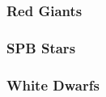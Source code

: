 {\color{red}



\subsubsection{Red Giants}

\subsubsection{SPB Stars}

\subsubsection{White Dwarfs}



}
